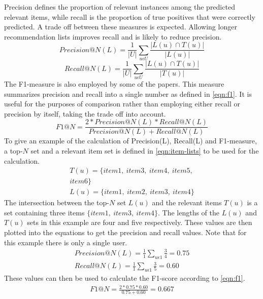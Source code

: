 Precision defines the proportion of relevant instances among the predicted relevant items, while recall is the proportion of true positives that were correctly predicted.
A trade off between these measures is expected.
Allowing longer recommendation lists improves recall and is likely to reduce precision\cite{RecommenderHandbook2015}.
\begin{equation}
    \label{eqn:precision}
    Precision@N(L) = \frac{1}{|U|} \sum\limits_{u \epsilon U}\frac{|L(u) \cap T(u)|}{|L(u)|}
\end{equation}
\begin{equation}
    \label{eqn:recall}
    Recall@N(L) = \frac{1}{|U|} \sum\limits_{u \epsilon U} \frac{|L(u) \cap T(u)|}{|T(u)|}
\end{equation}
The F1-measure is also employed by some of the papers.
This measure summarizes precision and recall into a single number as defined in \cref{eqn:f1}.
It is useful for the purposes of comparison rather than employing either recall or precision by itself, taking the trade off into account.
\begin{equation}
    \label{eqn:f1}
    F1@N = \frac{2*Precision@N(L)*Recall@N(L)}{Precision@N(L)+Recall@N(L)}
\end{equation}
To give an example of the calculation of Precision(L), Recall(L) and F1-measure, a top-$N$ set and a relevant item set is defined in \cref{eqn:item-lists} to be used for the calculation.
\begin{align}
    T(u) = \{item1, \: item3, \: item4, \: item5,\nonumber \\
     item6\} \nonumber \\
    L(u) = \{item1, \: item2, \: item3, \: item4\}\label{eqn:item-lists}
\end{align}
The intersection between the top-$N$ set $L(u)$ and the relevant items $T(u)$ is a set containing three items $\{item1, \: item3, \: item4\}$.
The lengths of the $L(u)$ and $T(u)$ sets in this example are four and five respectively.
These values are then plotted into the equations to get the precision and recall values.
Note that for this example there is only a single user.
\begin{align*}
    Precision@N(L) = \frac{1}{1} \sum\limits_{u \epsilon 1}\frac{3}{4} = 0.75\\
    Recall@N(L) = \frac{1}{1} \sum\limits_{u \epsilon 1} \frac{3}{5} = 0.60
\end{align*}
These values can then be used to calculate the F1-score according to \cref{eqn:f1}.
\begin{align*}
    F1@N = \frac{2*0.75*0.60}{0.75+0.60} = 0.667
\end{align*}
